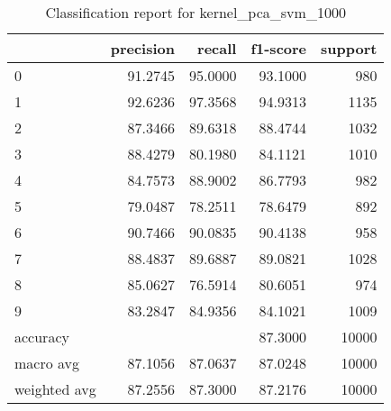 \begin{table}[htb!]
\centering
\begin{tabular}{lrrrr}
    \toprule
    & precision & recall & f1-score & support \\
    \midrule
    0 & 91.2745 & 95.0000 & 93.1000 & 980 \\
    1 & 92.6236 & 97.3568 & 94.9313 & 1135 \\
    2 & 87.3466 & 89.6318 & 88.4744 & 1032 \\
    3 & 88.4279 & 80.1980 & 84.1121 & 1010 \\
    4 & 84.7573 & 88.9002 & 86.7793 & 982 \\
    5 & 79.0487 & 78.2511 & 78.6479 & 892 \\
    6 & 90.7466 & 90.0835 & 90.4138 & 958 \\
    7 & 88.4837 & 89.6887 & 89.0821 & 1028 \\
    8 & 85.0627 & 76.5914 & 80.6051 & 974 \\
    9 & 83.2847 & 84.9356 & 84.1021 & 1009 \\
    accuracy & & & 87.3000 & 10000 \\
    macro avg & 87.1056 & 87.0637 & 87.0248 & 10000 \\
    weighted avg & 87.2556 & 87.3000 & 87.2176 & 10000 \\
    \bottomrule
\end{tabular}
\caption{Classification report for kernel_pca_svm_1000}
\label{tab:classification-report-kernel_pca_svm_1000}
\end{table}
